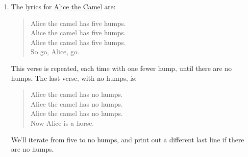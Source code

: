 \documentclass[]{book}
\theoremstyle{plain}
\theoremstyle{remark}
\begin{document}
\begin{enumerate}
\def\labelenumi{\arabic{enumi}.}
\item
  The lyrics for \href{http://www.kididdles.com/lyrics/a012.html}{Alice
  the Camel} are:

  \begin{quote}
  Alice the camel has five humps.\\
  Alice the camel has five humps.\\
  Alice the camel has five humps.\\
  So go, Alice, go.
  \end{quote}

  This verse is repeated, each time with one fewer hump, until there are
  no humps. The last verse, with no humps, is:

  \begin{quote}
  Alice the camel has no humps.\\
  Alice the camel has no humps.\\
  Alice the camel has no humps.\\
  Now Alice is a horse.
  \end{quote}

  We'll iterate from five to no humps, and print out a different last
  line if there are no humps.


\end{enumerate}
\end{document}
